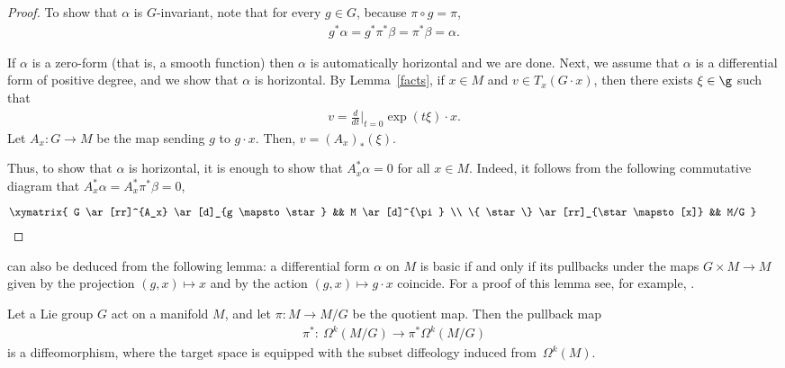 \begin{proof}
To show that $\alpha$ is $G$-invariant, note that for every $g \in G$, because $\pi\circ g=\pi$,
\begin{gather*}
g^* \alpha = g^* \pi^* \beta = \pi^* \beta = \alpha.
\end{gather*}

If $\alpha$ is a zero-form (that is, a smooth function)
then $\alpha$ is automatically horizontal and we are done.
Next, we assume that $\alpha$ is a dif\/ferential form of positive degree,
and we show that $\alpha$ is horizontal.
By Lemma~\ref{facts}, if $x\in M$ and $v\in T_x(G\cdot x)$, then there exists
$\xi\in\g$ such that
\begin{gather*}v=\frac{d}{dt}\Big|_{t=0}\exp(t\xi) \cdot x .\end{gather*}
Let $A_x\colon G\to M$ be the map sending $g$ to $g\cdot x$. Then, $v=(A_x)_*(\xi)$.

Thus, to show that $\alpha$ is horizontal, it is enough to show that $A_x^*\alpha=0$ for all $x\in M$. Indeed, it follows from the following commutative diagram that $A_x^*\alpha=A_x^*\pi^*\beta=0$,
\begin{gather*}
\begin{gathered}[b]
\xymatrix{
 G \ar[rr]^{A_x} \ar[d]_{g \mapsto \star} && M \ar[d]^{\pi} \\
 \{ \star \} \ar[rr]_{\star \mapsto [x]} && M/G
}\\[-17pt]
\null
\end{gathered}\tag*{\qed}
\end{gather*}
 \renewcommand{\qed}{}
\end{proof}

\begin{Remark}
 can also be deduced
from the following lemma:
a dif\/ferential form $\alpha$ on $M$ is basic
if and only if its pullbacks under the maps $G \times M \to M$
given by the projection $(g,x)\mapsto x$
and by the action $(g,x) \mapsto g\cdot x$ coincide.
For a proof of this lemma see, for example,
\cite[Lemma~3.3]{watts-groupoids}.
\end{Remark}

\begin{Proposition}
\label{p:injectivity}
Let a Lie group $G$ act on a manifold $M$,
and let $\pi \colon M \to M/G$ be the quotient map.
Then the pullback map
\begin{gather*} \pi^* \colon \ \Omega^k(M/G) \to \pi^*\Omega^k(M/G) \end{gather*}
is a diffeomorphism,
where the target space is equipped with the subset diffeology
induced \linebreak from~$\Omega^k(M)$.
\end{Proposition}

